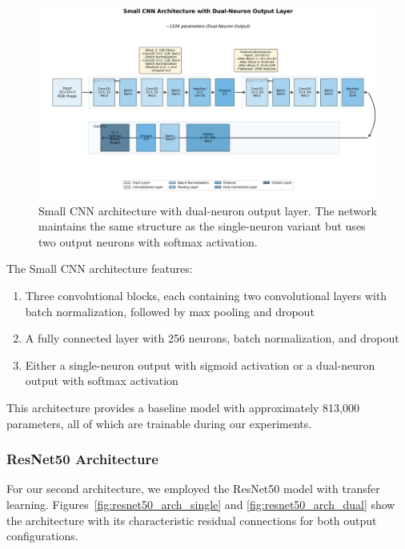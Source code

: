 \begin{figure}[htbp]
\centering
\includegraphics[width=\textwidth]{figures/small_cnn_2neuron_architecture.png}
\caption{Small CNN architecture with dual-neuron output layer. The network maintains the same structure as the single-neuron variant but uses two output neurons with softmax activation.}
\label{fig:small_cnn_arch_dual}
\end{figure}

The Small CNN architecture features:
\begin{enumerate}
\item Three convolutional blocks, each containing two convolutional layers with batch normalization, followed by max pooling and dropout
\item A fully connected layer with 256 neurons, batch normalization, and dropout
\item Either a single-neuron output with sigmoid activation or a dual-neuron output with softmax activation
\end{enumerate}

This architecture provides a baseline model with approximately 813,000 parameters, all of which are trainable during our experiments.

\subsubsection{ResNet50 Architecture}

For our second architecture, we employed the ResNet50 model with transfer learning. Figures~\ref{fig:resnet50_arch_single} and \ref{fig:resnet50_arch_dual} show the architecture with its characteristic residual connections for both output configurations.

